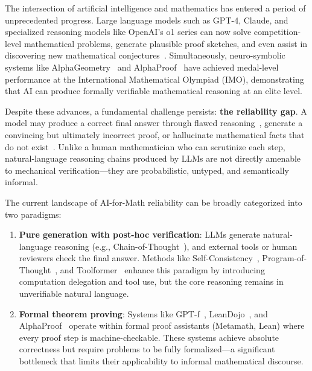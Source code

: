 \documentclass[11pt,a4paper]{article}
\begin{document}
The intersection of artificial intelligence and mathematics has entered a period of unprecedented progress. Large language models such as GPT-4, Claude, and specialized reasoning models like OpenAI's o1 series can now solve competition-level mathematical problems, generate plausible proof sketches, and even assist in discovering new mathematical conjectures~\cite{wei2022chain, openai2024learning, chen2026lectures}. Simultaneously, neuro-symbolic systems like AlphaGeometry~\cite{trinh2024solving} and AlphaProof~\cite{hubert2025alphaproof} have achieved medal-level performance at the International Mathematical Olympiad (IMO), demonstrating that AI can produce formally verifiable mathematical reasoning at an elite level.

Despite these advances, a fundamental challenge persists: \textbf{the reliability gap}. A model may produce a correct final answer through flawed reasoning~\cite{liang2024mathcheck}, generate a convincing but ultimately incorrect proof, or hallucinate mathematical facts that do not exist~\cite{huang2025hallucination}. Unlike a human mathematician who can scrutinize each step, natural-language reasoning chains produced by LLMs are not directly amenable to mechanical verification---they are probabilistic, untyped, and semantically informal.

The current landscape of AI-for-Math reliability can be broadly categorized into two paradigms:

\begin{enumerate}[leftmargin=*]
    \item \textbf{Pure generation with post-hoc verification}: LLMs generate natural-language reasoning (e.g., Chain-of-Thought~\cite{wei2022chain}), and external tools or human reviewers check the final answer. Methods like Self-Consistency~\cite{wang2022self}, Program-of-Thought~\cite{chen2022program}, and Toolformer~\cite{schick2023toolformer} enhance this paradigm by introducing computation delegation and tool use, but the core reasoning remains in unverifiable natural language.
    
    \item \textbf{Formal theorem proving}: Systems like GPT-f~\cite{polu2020generative}, LeanDojo~\cite{yang2023leandojo}, and AlphaProof~\cite{hubert2025alphaproof} operate within formal proof assistants (Metamath, Lean) where every proof step is machine-checkable. These systems achieve absolute correctness but require problems to be fully formalized---a significant bottleneck that limits their applicability to informal mathematical discourse.
\end{enumerate}
\end{document}
